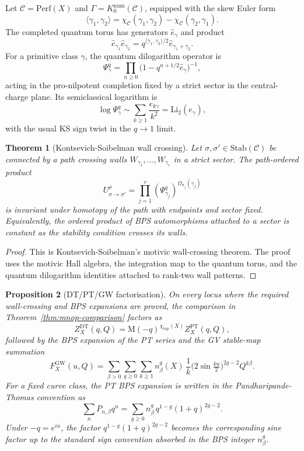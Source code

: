 \documentclass[11pt]{article}
\newtheorem{theorem}{Theorem}
\newtheorem{proposition}[theorem]{Proposition}
\theoremstyle{definition}
\providecommand{\cC}{\mathcal{C}}
\providecommand{\Perf}{\mathrm{Perf}}
\providecommand{\Stab}{\mathrm{Stab}}
\providecommand{\DT}{\mathrm{DT}}
\providecommand{\GW}{\mathrm{GW}}
\providecommand{\PT}{\mathrm{PT}}
\providecommand{\Li}{\mathrm{Li}}
\providecommand{\MM}{\mathrm{M}}
\providecommand{\topc}{\mathrm{top}}
\begin{document}
Let \(\cC=\Perf(X)\) and
\(\Gamma=K^{\mathrm{num}}_0(\cC)\), equipped with the skew Euler form
\[
  \langle \gamma_1,\gamma_2\rangle
  =
  \chi_\cC(\gamma_1,\gamma_2)-\chi_\cC(\gamma_2,\gamma_1).
\]
The completed quantum torus has generators \(\hat e_\gamma\) and product
\[
  \hat e_{\gamma_1}\hat e_{\gamma_2}
  =
  q^{\langle\gamma_1,\gamma_2\rangle/2}
  \hat e_{\gamma_1+\gamma_2}.
\]
For a primitive class \(\gamma\), the quantum dilogarithm operator is
\[
  \Psi_\gamma^q
  =
  \prod_{n\ge0}\bigl(1-q^{n+1/2}\hat e_\gamma\bigr)^{-1},
\]
acting in the pro-nilpotent completion fixed by a strict sector in the
central-charge plane.  Its semiclassical logarithm is
\[
  \log \Psi_\gamma^q
  \sim
  \sum_{k\ge1}\frac{e_{k\gamma}}{k^2}
  =
  \Li_2(e_\gamma),
\]
with the usual KS sign twist in the \(q\to1\) limit.

\begin{theorem}[Kontsevich-Soibelman wall crossing]
\label{thm:ks-wall-crossing}
Let \(\sigma,\sigma'\in\Stab(\cC)\) be connected by a path crossing
walls \(W_{\gamma_1},\ldots,W_{\gamma_r}\) in a strict sector.  The
path-ordered product
\[
  U^\rho_{\sigma\to\sigma'}
  =
  \prod_{j=1}^r
  \left(\Psi^q_{\gamma_j}\right)^{\Omega_{\sigma_j}(\gamma_j)}
\]
is invariant under homotopy of the path with endpoints and sector fixed.
Equivalently, the ordered product of BPS automorphisms attached to a
sector is constant as the stability condition crosses its walls.
\end{theorem}

\begin{proof}
This is Kontsevich-Soibelman's motivic wall-crossing theorem.  The proof
uses the motivic Hall algebra, the integration map to the quantum torus,
and the quantum dilogarithm identities attached to rank-two wall
patterns.
\end{proof}

\begin{proposition}[DT/PT/GW factorisation]
\label{prop:dt-pt-gw-factorisation}
On every locus where the required wall-crossing and BPS expansions are
proved, the comparison in Theorem~\ref{thm:mnop-comparison} factors as
\[
  Z_X^{\DT}(q,Q)
  =
  \MM(-q)^{\chi_{\topc}(X)}Z_X^{\PT}(q,Q),
\]
followed by the BPS expansion of the PT series and the GV stable-map
summation
\[
  F_X^{\GW}(u,Q)
  =
  \sum_{\beta>0}\sum_{g\ge0}\sum_{k\ge1}
  n^g_\beta(X)\,
  \frac{1}{k}
  \bigl(2\sin\tfrac{ku}{2}\bigr)^{2g-2}
  Q^{k\beta}.
\]
For a fixed curve class, the PT BPS expansion is written in the
Pandharipande-Thomas convention as
\[
  \sum_n P_{n,\beta}q^n
  =
  \sum_{g\ge0} n^g_\beta\,q^{1-g}(1+q)^{2g-2}.
\]
Under \(-q=e^{iu}\), the factor \(q^{1-g}(1+q)^{2g-2}\) becomes the
corresponding sine factor up to the standard sign convention absorbed in
the BPS integer \(n^g_\beta\).
\end{proposition}
\end{document}
